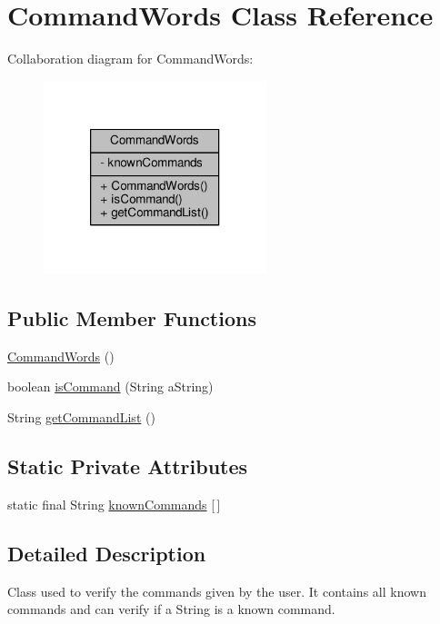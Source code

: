 \hypertarget{classCommandWords}{\section{Command\-Words Class Reference}
\label{classCommandWords}
}


Collaboration diagram for Command\-Words\-:
\nopagebreak
\begin{figure}[H]
\begin{center}
\leavevmode
\includegraphics[width=184pt]{classCommandWords__coll__graph}
\end{center}
\end{figure}
\subsection*{Public Member Functions}
\begin{DoxyCompactItemize}
\item 
\hyperlink{classCommandWords_a2d8c096723adb3f822cc001bccd92ed7}{Command\-Words} ()
\item 
boolean \hyperlink{classCommandWords_a98619d278b3fa23fed18b5834f9d20a8}{is\-Command} (String a\-String)
\item 
String \hyperlink{classCommandWords_aa26f54985e39543739e0ae291dcdb8f1}{get\-Command\-List} ()
\end{DoxyCompactItemize}
\subsection*{Static Private Attributes}
\begin{DoxyCompactItemize}
\item 
static final String \hyperlink{classCommandWords_a328bb081d9a9e5cb1aa6362523b28783}{known\-Commands} \mbox{[}$\,$\mbox{]}
\end{DoxyCompactItemize}


\subsection{Detailed Description}
Class used to verify the commands given by the user. It contains all known commands and can verify if a String is a known command.

